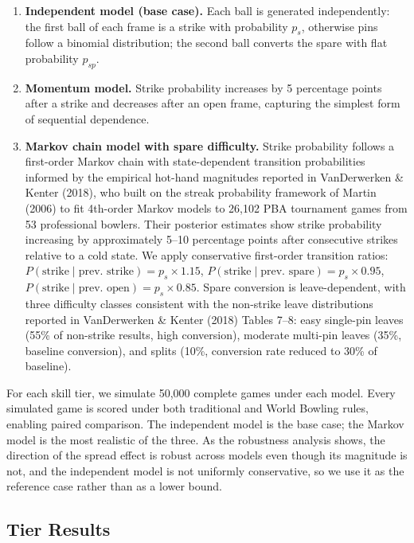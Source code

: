 \documentclass[
  letterpaper,
  DIV=11,
  numbers=noendperiod]{scrartcl}
\begin{document}
\begin{enumerate}
\def\labelenumi{\arabic{enumi}.}
\item
  \textbf{Independent model (base case).} Each ball is generated
  independently: the first ball of each frame is a strike with
  probability \(p_s\), otherwise pins follow a binomial distribution;
  the second ball converts the spare with flat probability \(p_{sp}\).
\item
  \textbf{Momentum model.} Strike probability increases by 5 percentage
  points after a strike and decreases after an open frame, capturing the
  simplest form of sequential dependence.
\item
  \textbf{Markov chain model with spare difficulty.} Strike probability
  follows a first-order Markov chain with state-dependent transition
  probabilities informed by the empirical hot-hand magnitudes reported
  in VanDerwerken \& Kenter (2018), who built on the streak probability
  framework of Martin (2006) to fit 4th-order Markov models to 26,102
  PBA tournament games from 53 professional bowlers. Their posterior
  estimates show strike probability increasing by approximately 5--10
  percentage points after consecutive strikes relative to a cold state.
  We apply conservative first-order transition ratios:
  \(P(\text{strike} \mid \text{prev. strike}) = p_s \times 1.15\),
  \(P(\text{strike} \mid \text{prev. spare}) = p_s \times 0.95\),
  \(P(\text{strike} \mid \text{prev. open}) = p_s \times 0.85\). Spare
  conversion is leave-dependent, with three difficulty classes
  consistent with the non-strike leave distributions reported in
  VanDerwerken \& Kenter (2018) Tables 7--8: easy single-pin leaves
  (55\% of non-strike results, high conversion), moderate multi-pin
  leaves (35\%, baseline conversion), and splits (10\%, conversion rate
  reduced to 30\% of baseline).
\end{enumerate}

For each skill tier, we simulate 50,000 complete games under each model.
Every simulated game is scored under both traditional and World Bowling
rules, enabling paired comparison. The independent model is the base
case; the Markov model is the most realistic of the three. As the
robustness analysis shows, the direction of the spread effect is robust
across models even though its magnitude is not, and the independent
model is not uniformly conservative, so we use it as the reference case
rather than as a lower bound.

\subsection{Tier Results}\label{tier-results}
\end{document}
